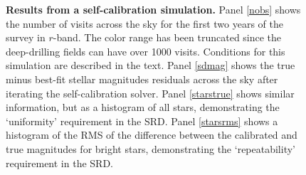 \documentclass[12pt,preprint]{aastex}
\begin{document}
\begin{figure}
{\begin{minipage}{6.5in}
\caption{{\small {\bf Results from a self-calibration simulation.}
Panel \ref{nobs} shows the number of visits across the sky for the
first two years of the survey in $r$-band.  The color range has been
truncated since the deep-drilling fields can have over 1000 visits.
Conditions for this simulation are described in the text.  Panel
\ref{sdmag} shows the true minus best-fit stellar magnitudes residuals
across the sky after iterating the self-calibration solver. Panel
\ref{starstrue} shows similar information, but as a histogram of all
stars, demonstrating the `uniformity' requirement in the SRD. Panel
\ref{starsrms} shows a histogram of the RMS of the difference between
the calibrated and true magnitudes for bright stars, demonstrating the
`repeatability' requirement in the SRD.  }}
\label{fig:selfcal_fiducial}
\end{minipage}
}
\end{figure}

\begin{figure}
\centering
{}
\end{figure}


\begin{figure}
\centering
{}
\end{figure}
\end{document}
